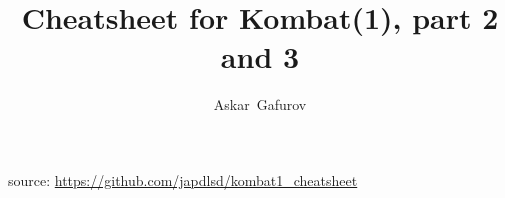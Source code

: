\documentclass[10pt, twocolumn]{article}
\title{Cheatsheet for Kombat(1), part 2 and 3}
\author{Askar~Gafurov}
\begin{document}









\hrulefill

source: \url{https://github.com/japdlsd/kombat1_cheatsheet}
\end{document}
